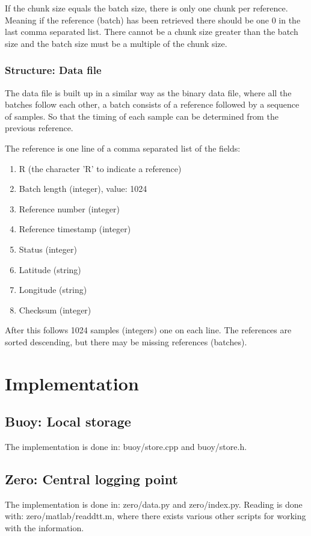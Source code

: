 \documentclass[a4paper]{article}
\begin{document}
\begin{multicols}{2}
  If the chunk size equals the batch size, there is only one chunk per
  reference. Meaning if the reference (batch) has been retrieved there
  should be one 0 in the last comma separated list. There cannot be a
  chunk size greater than the batch size and the batch size must be a
  multiple of the chunk size.

  \subsubsection{Structure: Data file}
  The data file is built up in a similar way as the binary data file,
  where all the batches follow each other, a batch consists of a
  reference followed by a sequence of samples. So that the timing of
  each sample can be determined from the previous reference.

  The reference is one line of a comma separated list of the fields: \\
  \begin{enumerate}
    \item R (the character 'R' to indicate a reference)
    \item Batch length (integer), value: 1024
    \item Reference number (integer)
    \item Reference timestamp (integer)
    \item Status (integer)
    \item Latitude (string)
    \item Longitude (string)
    \item Checksum (integer)
  \end{enumerate}

  After this follows 1024 samples (integers) one on each line. The
  references are sorted descending, but there may be missing references
  (batches).

  \section{Implementation}
  \subsection{Buoy: Local storage}
  The implementation is done in: buoy/store.cpp and buoy/store.h.

  \subsection{Zero: Central logging point}
  The implementation is done in: zero/data.py and zero/index.py. Reading
  is done with: zero/matlab/readdtt.m, where there exists various other
  scripts for working with the information.


\end{multicols}
\end{document}
